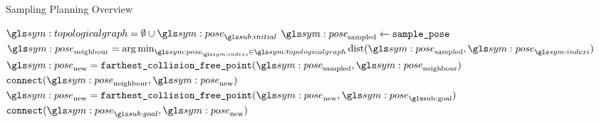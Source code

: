 	\begin{algorithm}[ht]
		\caption{Sampling Planning Overview}%
		\label{alg:sampling_planning_overview}
		\begin{algorithmic}[1]
				\State{}$\topologicalgraph = \emptyset \cup \pose_{\initial}$
				\While{$\pose_{\goal} \notin \topologicalgraph$}
					\Repeat{}
						\State{}$\pose_\text{sampled} \leftarrow
						\code{sample\_pose}$\label{alg:sampling_planning_overview:sample_pose}
					\Until{$\robot(\pose) \notin \configurationspace_{\obstacleregion}$}
					\State{}
						\(
							\pose_{\text{neighbour}} =
							\argmin_{\pose_{\indexi} \in
							\topologicalgraph}\dist(\pose_\text{sampled}, \pose_{\indexi})
						\)
					\State{}$\pose_\text{new} =
						\code{farthest\_collision\_free\_point}(\pose_{\text{sampled}},
						\pose_{\text{neighbour}})$\label{alg:sampling_planning_overview:farthest_collision_free_point_sampled}
					\State{}$\code{connect}(\pose_\text{neighbour},
						\pose_\text{new})$
					\State{}$\pose_\text{new} =
						\code{farthest\_collision\_free\_point}(\pose_{\text{new}},
						\pose_{\text{\goal}})$\label{alg:sampling_planning_overview:farthest_collision_free_point_goal}
						\State{}$\code{connect}(\pose_{\goal},
							\pose_\text{new})$
					\EndIf{}
				\EndWhile{}
			\EndProcedure{}
		\end{algorithmic}
	\end{algorithm}
